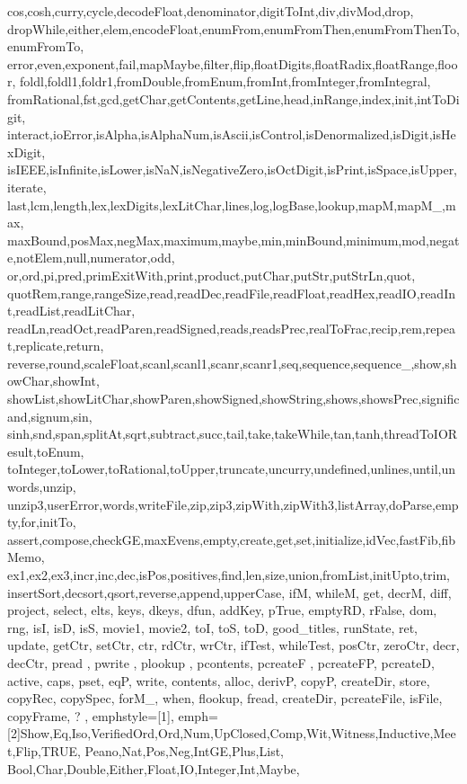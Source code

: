 {{		cos,cosh,curry,cycle,decodeFloat,denominator,digitToInt,div,divMod,drop,
		dropWhile,either,elem,encodeFloat,enumFrom,enumFromThen,enumFromThenTo,enumFromTo,
		error,even,exponent,fail,mapMaybe,filter,flip,floatDigits,floatRadix,floatRange,floor,
		foldl,foldl1,foldr1,fromDouble,fromEnum,fromInt,fromInteger,fromIntegral,
		fromRational,fst,gcd,getChar,getContents,getLine,head,inRange,index,init,intToDigit,
		interact,ioError,isAlpha,isAlphaNum,isAscii,isControl,isDenormalized,isDigit,isHexDigit,
		isIEEE,isInfinite,isLower,isNaN,isNegativeZero,isOctDigit,isPrint,isSpace,isUpper,iterate,
		last,lcm,length,lex,lexDigits,lexLitChar,lines,log,logBase,lookup,mapM,mapM_,max,
		maxBound,posMax,negMax,maximum,maybe,min,minBound,minimum,mod,negate,notElem,null,numerator,odd,
		or,ord,pi,pred,primExitWith,print,product,putChar,putStr,putStrLn,quot,
		quotRem,range,rangeSize,read,readDec,readFile,readFloat,readHex,readIO,readInt,readList,readLitChar,
		readLn,readOct,readParen,readSigned,reads,readsPrec,realToFrac,recip,rem,repeat,replicate,return,
		reverse,round,scaleFloat,scanl,scanl1,scanr,scanr1,seq,sequence,sequence_,show,showChar,showInt,
		showList,showLitChar,showParen,showSigned,showString,shows,showsPrec,significand,signum,sin,
		sinh,snd,span,splitAt,sqrt,subtract,succ,tail,take,takeWhile,tan,tanh,threadToIOResult,toEnum,
		toInteger,toLower,toRational,toUpper,truncate,uncurry,undefined,unlines,until,unwords,unzip,
		unzip3,userError,words,writeFile,zip,zip3,zipWith,zipWith3,listArray,doParse,empty,for,initTo,
        assert,compose,checkGE,maxEvens,empty,create,get,set,initialize,idVec,fastFib,fibMemo,
        ex1,ex2,ex3,incr,inc,dec,isPos,positives,find,len,size,union,fromList,initUpto,trim,
        insertSort,decsort,qsort,reverse,append,upperCase, ifM, whileM, get, decrM, diff,
        project, select, elts, keys, dkeys, dfun, addKey, pTrue, emptyRD, rFalse,
        	dom, rng, isI, isD, isS, movie1, movie2,  toI, toS, toD, good_titles, runState, ret,
        	update, getCtr, setCtr, ctr, rdCtr, wrCtr, ifTest, whileTest, posCtr, zeroCtr, decr, decCtr,
        	pread , pwrite , plookup , pcontents, pcreateF , pcreateFP, pcreateD, active, caps, pset, eqP,
        	write, contents, alloc, derivP, copyP, createDir, store, copyRec, copySpec,
        	forM_, when, flookup, fread, createDir, pcreateFile, isFile, copyFrame, ?
	},
	emphstyle={[1]\color{haskellblue}},
	emph=
	{[2]Show,Eq,Iso,VerifiedOrd,Ord,Num,UpClosed,Comp,Wit,Witness,Inductive,Meet,Flip,TRUE,
	    Peano,Nat,Pos,Neg,IntGE,Plus,List,
        Bool,Char,Double,Either,Float,IO,Integer,Int,Maybe,
}}
